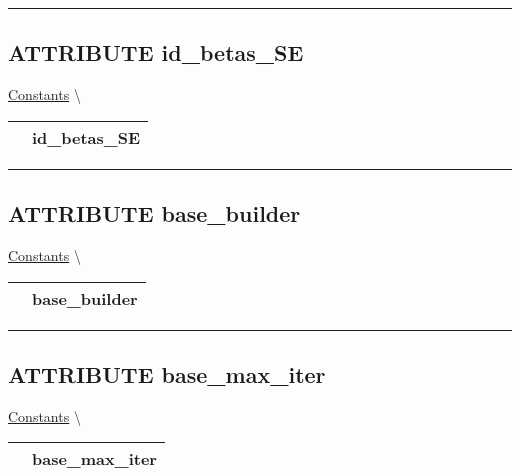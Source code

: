 \par


\rule{\linewidth}{0.5pt}
\subsection*{\textsf{\colorbox{headtoc}{\color{white} ATTRIBUTE}
id\_betas\_SE}}

\hypertarget{ecldoc:constants.id_betas_se}{}
\hspace{0pt} \hyperlink{ecldoc:Constants}{Constants} \textbackslash 

{\renewcommand{\arraystretch}{1.5}
\begin{tabularx}{\textwidth}{|>{\raggedright\arraybackslash}l|X|}
\hline
\hspace{0pt}\mytexttt{\color{red} } & \textbf{id\_betas\_SE} \\
\hline
\end{tabularx}
}

\par


\rule{\linewidth}{0.5pt}
\subsection*{\textsf{\colorbox{headtoc}{\color{white} ATTRIBUTE}
base\_builder}}

\hypertarget{ecldoc:constants.base_builder}{}
\hspace{0pt} \hyperlink{ecldoc:Constants}{Constants} \textbackslash 

{\renewcommand{\arraystretch}{1.5}
\begin{tabularx}{\textwidth}{|>{\raggedright\arraybackslash}l|X|}
\hline
\hspace{0pt}\mytexttt{\color{red} } & \textbf{base\_builder} \\
\hline
\end{tabularx}
}

\par


\rule{\linewidth}{0.5pt}
\subsection*{\textsf{\colorbox{headtoc}{\color{white} ATTRIBUTE}
base\_max\_iter}}

\hypertarget{ecldoc:constants.base_max_iter}{}
\hspace{0pt} \hyperlink{ecldoc:Constants}{Constants} \textbackslash 

{\renewcommand{\arraystretch}{1.5}
\begin{tabularx}{\textwidth}{|>{\raggedright\arraybackslash}l|X|}
\hline
\hspace{0pt}\mytexttt{\color{red} } & \textbf{base\_max\_iter} \\
\hline
\end{tabularx}
}

